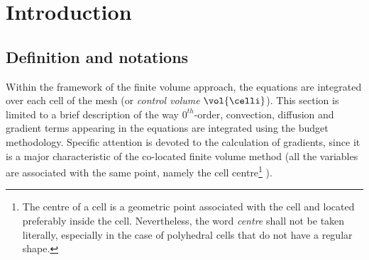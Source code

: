 
%
%
%
%


\section{Introduction}

\subsection{Definition and notations}\label{sec:spadis:notations}

Within the framework of the finite volume approach, the equations are
integrated over each cell of the mesh (or \emph{control volume} $\vol{\celli}$). 
This section is limited to a brief description of the way $0^{th}$-order, convection, diffusion and gradient terms appearing in
the equations are integrated using the budget methodology. Specific attention is devoted to the
calculation of gradients, since it is a major characteristic of the
co-located finite volume method (all the variables are associated with the
same point, namely the cell centre\footnote{%
The centre of a cell is a geometric point associated with the cell and
located preferably inside the cell. Nevertheless, the word \emph{centre} shall
not be taken literally,
especially in the case of polyhedral cells that do not have a regular shape.}%
).

